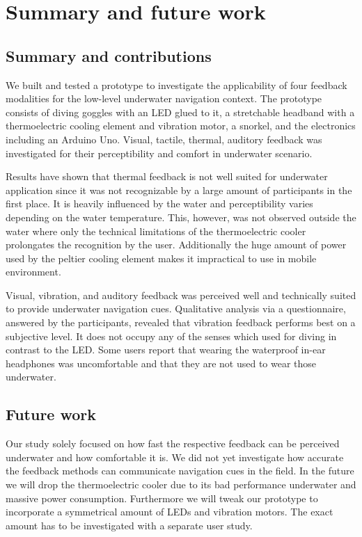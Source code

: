 %

\chapter{Summary and future work}
\label{summaryandfuturework}


\section{Summary and contributions}
\label{summaryandfuturework.summary}

We built and tested a prototype to investigate the applicability of four feedback modalities for the low-level underwater navigation context.
The prototype consists of diving goggles with an LED glued to it, a stretchable headband with a thermoelectric cooling element and vibration motor, a snorkel, and the electronics including an Arduino Uno.
Visual, tactile, thermal, auditory feedback was investigated for their perceptibility and comfort in underwater scenario.

Results have shown that thermal feedback is not well suited for underwater application since it was not recognizable by a large amount of participants in the first place.
It is heavily influenced by the water and perceptibility varies depending on the water temperature.
This, however, was not observed outside the water where only the technical limitations of the thermoelectric cooler prolongates the recognition by the user.
Additionally the huge amount of power used by the peltier cooling element makes it impractical to use in mobile environment.

Visual, vibration, and auditory feedback was perceived well and technically suited to provide underwater navigation cues.
Qualitative analysis via a questionnaire, answered by the participants, revealed that vibration feedback performs best on a subjective level.
It does not occupy any of the senses which used for diving in contrast to the LED.
Some users report that wearing the waterproof in-ear headphones was uncomfortable and that they are not used to wear those underwater.

\section{Future work}
\label{summaryandfuturework.futurework}
Our study solely focused on how fast the respective feedback can be perceived underwater and how comfortable it is.
We did not yet investigate how accurate the feedback methods can communicate navigation cues in the field.
In the future we will drop the thermoelectric cooler due to its bad performance underwater and massive power consumption.
Furthermore we will tweak our prototype to incorporate a symmetrical amount of LEDs and vibration motors.
The exact amount has to be investigated with a separate user study.

